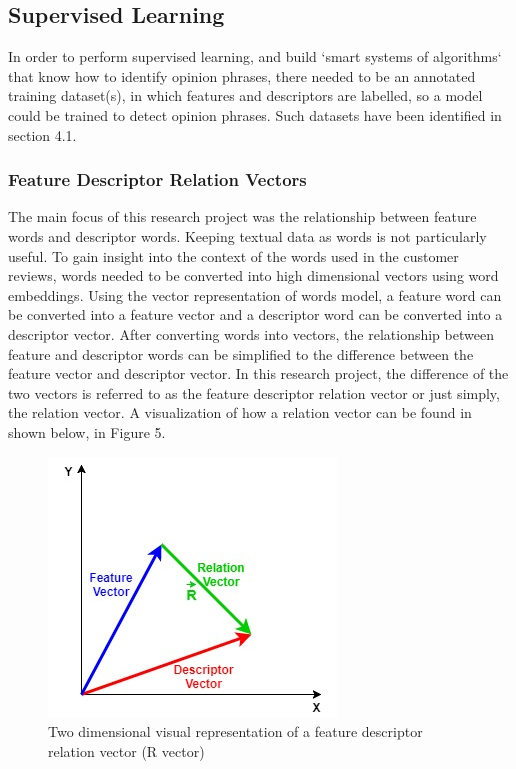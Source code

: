 \documentclass{sig-alternate}
\begin{document}
\subsection{Supervised Learning}
In order to perform supervised learning, and build `smart systems of algorithms` that know how to identify opinion phrases, there needed to be an annotated training dataset(s), in which features and descriptors are labelled, so a model could be trained to detect opinion phrases. Such datasets have been identified in section 4.1. 

\subsubsection{Feature Descriptor Relation Vectors}
The main focus of this research project was the relationship between feature words and descriptor words. Keeping textual data as words is not particularly useful. To gain insight into the context of the words used in the customer reviews, words needed to be converted into high dimensional vectors using word embeddings. Using the vector representation of words model, a feature word can be converted into a feature vector and a descriptor word can be converted into a descriptor vector. After converting words into vectors, the relationship between feature and descriptor words can be simplified to the difference between the feature vector and descriptor vector. In this research project, the difference of the two vectors is referred to as the feature descriptor relation vector or just simply, the relation vector. A visualization of how a relation vector can be found in shown below, in Figure 5.

\begin{figure}
\centering
\includegraphics[scale=0.60]{images/relation_vec.jpg}
\caption{Two dimensional visual representation of a feature descriptor relation vector (R vector)}
\end{figure}
\end{document}
